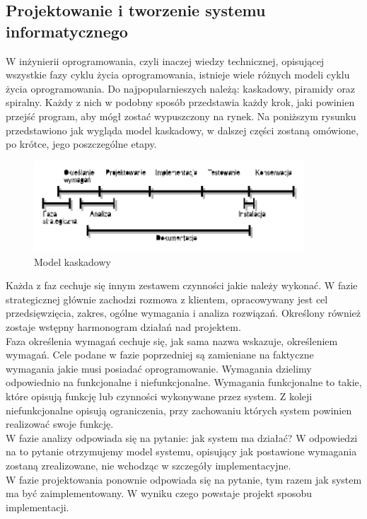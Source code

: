 \documentclass[12pt]{article}
\begin{document}
\begin{sloppypar}
{\subsection{Projektowanie i tworzenie systemu informatycznego}
{
  W inżynierii oprogramowania, czyli inaczej wiedzy technicznej, opisującej wszystkie fazy cyklu życia oprogramowania, istnieje wiele różnych modeli 
  cyklu życia oprogramowania. Do najpopularnieszych należą: kaskadowy, piramidy oraz spiralny. Każdy z nich w podobny sposób przedstawia każdy krok, 
  jaki powinien przejść program, aby mógł zostać wypuszczony na rynek. Na poniższym rysunku przedstawiono jak wygląda model kaskadowy, w dalszej części zostaną 
  omówione, po krótce, jego poszczególne etapy.
  \begin{figure}[H]
    \centering
    \includegraphics[width=0.9\textwidth]{model_kaskadowy}
    \caption{Model kaskadowy}
    \label{fig:cascade}
  \end{figure}
  Każda z faz cechuje się innym zestawem czynności jakie należy wykonać. 
  W fazie strategicznej głównie zachodzi rozmowa z klientem, opracowywany jest cel przedsięwzięcia, zakres, ogólne wymagania i analiza rozwiązań.
  Określony również zostaje wstępny harmonogram działań nad projektem.\\
  Faza określenia wymagań cechuje się, jak sama nazwa wskazuje, określeniem wymagań. Cele podane w fazie poprzedniej są zamieniane na faktyczne wymagania 
  jakie musi posiadać oprogramowanie. Wymagania dzielimy odpowiednio na funkcjonalne i niefunkcjonalne. 
  Wymagania funkcjonalne to takie, które opisują funkcję lub czynności wykonywane przez system. 
  Z koleji niefunkcjonalne opisują ograniczenia, przy zachowaniu których system powinien realizować swoje funkcję.\\
  W fazie analizy odpowiada się na pytanie: jak system ma działać? 
  W odpowiedzi na to pytanie otrzymujemy model systemu, opisujący jak postawione wymagania zostaną zrealizowane, nie wchodząc w szczegóły implementacyjne.\\
  W fazie projektowania ponownie odpowiada się na pytanie, tym razem jak system ma być zaimplementowany. W wyniku czego powstaje projekt sposobu implementacji.\\
}}
\end{sloppypar}
\end{document}
